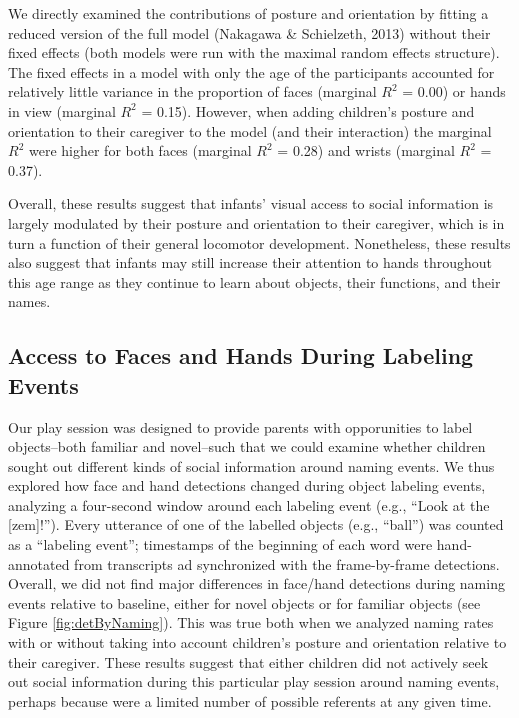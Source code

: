 \documentclass[english,man]{apa6}
\begin{document}
We directly examined the contributions of posture and orientation by
fitting a reduced version of the full model (Nakagawa \& Schielzeth,
2013) without their fixed effects (both models were run with the maximal
random effects structure). The fixed effects in a model with only the
age of the participants accounted for relatively little variance in the
proportion of faces (marginal \(R^2\) = 0.00) or hands in view (marginal
\(R^2\) = 0.15). However, when adding children's posture and orientation
to their caregiver to the model (and their interaction) the marginal
\(R^2\) were higher for both faces (marginal \(R^2\) = 0.28) and wrists
(marginal \(R^2\) = 0.37).

Overall, these results suggest that infants' visual access to social
information is largely modulated by their posture and orientation to
their caregiver, which is in turn a function of their general locomotor
development. Nonetheless, these results also suggest that infants may
still increase their attention to hands throughout this age range as
they continue to learn about objects, their functions, and their names.

\subsection{Access to Faces and Hands During Labeling
Events}\label{access-to-faces-and-hands-during-labeling-events}

Our play session was designed to provide parents with opporunities to
label objects--both familiar and novel--such that we could examine
whether children sought out different kinds of social information around
naming events. We thus explored how face and hand detections changed
during object labeling events, analyzing a four-second window around
each labeling event (e.g., \enquote{Look at the {[}zem{]}!}). Every
utterance of one of the labelled objects (e.g., \enquote{ball}) was
counted as a \enquote{labeling event}; timestamps of the beginning of
each word were hand-annotated from transcripts ad synchronized with the
frame-by-frame detections. Overall, we did not find major differences in
face/hand detections during naming events relative to baseline, either
for novel objects or for familiar objects (see Figure
\ref{fig:detByNaming}). This was true both when we analyzed naming rates
with or without taking into account children's posture and orientation
relative to their caregiver. These results suggest that either children
did not actively seek out social information during this particular play
session around naming events, perhaps because were a limited number of
possible referents at any given time.
\end{document}
